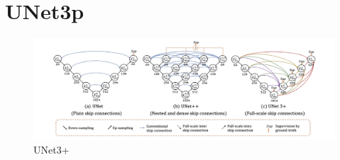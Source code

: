 \documentclass[11pt]{beamer}
\begin{document}
\section{UNet3p}
\begin{figure}
  \begin{center}
    \includegraphics[scale=1.1]{images/unet3p.png}
  \end{center}
  \caption{UNet3+}\label{fig:}
\end{figure}
\end{document}
